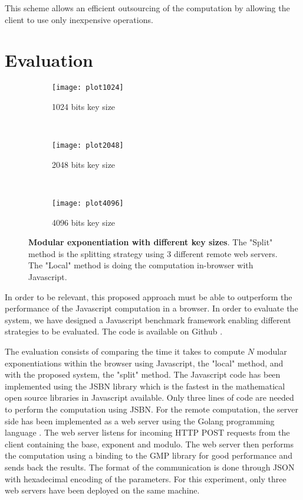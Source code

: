 \documentclass[]{article}
\begin{document}
This scheme allows an efficient outsourcing of the computation by allowing the
client to use only inexpensive operations.

\section{Evaluation} \label{evaluation}

\begin{figure}[ht!]

   \centering

   \begin{subfigure}[b]{0.8\textwidth}
       \label{fig:plot1024}
       \texttt{[image: plot1024]}
       \caption{1024 bits key size}
   \end{subfigure}
   ~
   \begin{subfigure}[b]{0.8\textwidth}
       \label{fig:plot2048}
       \texttt{[image: plot2048]}
       \caption{2048 bits key size}
   \end{subfigure}
   ~
   \begin{subfigure}[b]{0.8\textwidth}
       \label{fig:plot4096}
       \texttt{[image: plot4096]}
       \caption{4096 bits key size}
   \end{subfigure}

   \caption{\textbf{Modular exponentiation with different key sizes}. The
   "Split" method is the splitting strategy using 3 different remote web
   servers. The "Local" method is doing the computation in-browser with
   Javascript.}

   \label{fig:modexp}
        
\end{figure}

In order to be relevant, this proposed approach must be able to outperform the
performance of the Javascript computation in a browser. In order to evaluate the
system, we have designed a Javascript benchmark framework enabling different
strategies to be evaluated. The code is available on Github \cite{code}.

The evaluation consists of comparing the time it takes to compute $N$ modular
exponentiations within the browser using Javascript, the "local" method, and
with the proposed system, the "split" method. The Javascript
code has been implemented using the JSBN library \cite{jsbn} which is the
fastest in the mathematical open source libraries in Javascript available. Only
three lines of code are needed to perform the computation using JSBN. For the
remote computation, the server side has been implemented as a web server using
the Golang programming language \cite{golang}. The web server listens for
incoming HTTP POST requests from the client containing the base, exponent and
modulo.  The web server then performs the computation using a binding to the GMP
library \cite{gmplib} for good performance and sends back the results. The
format of the communication is done through JSON with hexadecimal encoding of
the parameters. For this experiment, only three web servers have been deployed
on the same machine.
\end{document}

